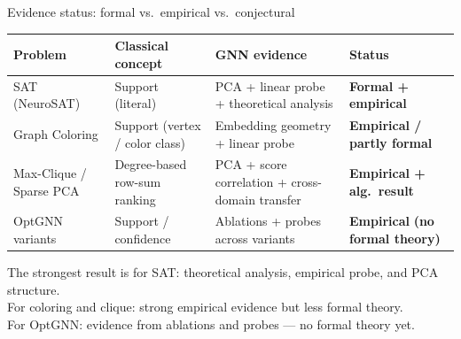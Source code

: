 \documentclass[aspectratio=169,10pt,dvipsnames]{beamer}
\begin{document}
\begin{frame}{Evidence status: formal vs.\ empirical vs.\ conjectural}

\small\renewcommand{\arraystretch}{1.45}
\begin{tabular}{@{}p{2.8cm}p{2.6cm}p{3.2cm}p{2.4cm}@{}}
\toprule
\textbf{Problem} & \textbf{Classical concept} & \textbf{GNN evidence} & \textbf{Status} \\
\midrule
SAT (NeuroSAT) & Support (literal) & PCA + linear probe + theoretical analysis &
  \textcolor{bgucolor}{\textbf{Formal +}} \textcolor{bgucolor}{\textbf{empirical}} \\
Graph Coloring & Support (vertex / color class) & Embedding geometry + linear probe &
  \textcolor{ForestGreen!70!black}{\textbf{Empirical /}} \textcolor{ForestGreen!70!black}{\textbf{partly formal}} \\
Max-Clique / Sparse PCA & Degree-based row-sum ranking & PCA + score correlation + cross-domain transfer &
  \textcolor{ForestGreen!70!black}{\textbf{Empirical +}} \textcolor{ForestGreen!70!black}{\textbf{alg.\ result}} \\
OptGNN variants & Support / confidence & Ablations + probes across variants &
  \textcolor{orange!80!black}{\textbf{Empirical}} \textcolor{orange!80!black}{\textbf{(no formal theory)}} \\
\bottomrule
\end{tabular}

\bigskip
\begin{block}{}
\small
The strongest result is for SAT: theoretical analysis, empirical probe, and PCA structure.\\
For coloring and clique: strong empirical evidence but less formal theory.\\
For OptGNN: evidence from ablations and probes — no formal theory yet.
\end{block}

\end{frame}
\end{document}
